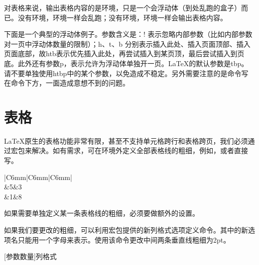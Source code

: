 对表格来说，输出表格内容的是环境，只是一个会浮动体（到处乱跑的盒子）而已。没有环境，环境一样会乱跑；没有环境，环境一样会输出表格内容。

下面是一个典型的浮动体例子。参数含义是：! 表示忽略内部参数（比如内部参数对一页中浮动体数量的限制）；h、t、b 分别表示插入此处、插入页面顶部、插入页面底部，故htb表示优先插入此处，再尝试插入到某页顶，最后尝试插入到页底。此外还有参数p，表示允许为浮动体单独开一页。\LaTeX 的默认参数是tbp。请不要单独使用htbp中的某个参数，以免造成不稳定。另外需要注意的是命令写在命令下方，一面造成意想不到的问题。


\section{表格}
\LaTeX 原生的表格功能非常有限，甚至不支持单元格跨行和表格跨页，我们必须通过宏包来解决。如有需求，可在环境外定义全部表格线的粗细，例如，\latexline{\setlength{\arrayrulewidth}{2pt}}或者直接写\latexline{\arrayrulewidth=2pt}。

\begin{codeshow}
\centering
\arrayrulewidth=1pt%
\begin{tabular}{|C{6mm}|C{6mm}|C{6mm}|}
	\hline
	\\
	&5&3\\
	&1&8\\
	\hline
\end{tabular}
\end{codeshow}

如果需要单独定义某一条表格线的粗细，必须要做额外的设置。

如果我们要更改的粗细，可以利用宏包提供的新列格式选项定义命令。其中的新选项名只能用一个字母来表示。使用该命令更改中间两条垂直线粗细为2pt。

\begin{latex}{}
\newcolumntype{新选项名称}[参数数量]{列格式}
\end{latex}

